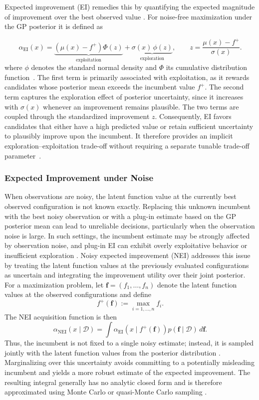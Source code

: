 Expected improvement (EI) remedies this by quantifying the expected magnitude of improvement over the best observed value \cite{jones1998efficient}. For noise-free maximization under the GP posterior it is defined as

\[
\alpha_{\mathrm{EI}}(x)
=
\underbrace{
\left(\mu(x)-f^{+}\right)\Phi(z)
}_{\text{exploitation}}
+
\underbrace{
\sigma(x)\,\phi(z)
}_{\text{exploration}},
\qquad
z=
\frac{\mu(x)-f^{+}}{\sigma(x)}.
\]
where $\phi$ denotes the standard normal density and $\Phi$ its cumulative distribution function~\cite{jones1998efficient}. The first term is primarily associated with exploitation, as it rewards candidates whose posterior mean exceeds the incumbent value $f^{+}$. The second term captures the exploration effect of posterior uncertainty, since it increases with $\sigma(x)$ whenever an improvement remains plausible. The two terms are coupled through the standardized improvement $z$. Consequently, EI favors candidates that either have a high predicted value or retain sufficient uncertainty to plausibly improve upon the incumbent. It therefore provides an implicit exploration--exploitation trade-off without requiring a separate tunable trade-off parameter~\cite{jones1998efficient}.

\subsubsection{Expected Improvement under Noise}
When observations are noisy, the latent function value at the currently best observed configuration is not known exactly. Replacing this unknown incumbent with the best noisy observation or with a plug-in estimate based on the GP posterior mean can lead to unreliable decisions, particularly when the observation noise is large. In such settings, the incumbent estimate may be strongly affected by observation noise, and plug-in EI can exhibit overly exploitative behavior or insufficient exploration \cite{letham2019constrained}. Noisy expected improvement (NEI) addresses this issue by treating the latent function values at the previously evaluated configurations as uncertain and integrating the improvement utility over their joint posterior. For a maximization problem, let $\mathbf{f}=(f_1,\ldots,f_n)$ denote the latent function values at the observed configurations and define
\[
f^{+}(\mathbf{f}) := \max_{i=1,\ldots,n} f_i.
\]
The NEI acquisition function is then
\[
\alpha_{\mathrm{NEI}}(x\mid\mathcal{D})
=
\int
\alpha_{\mathrm{EI}}\!\left(
x\mid f^{+}(\mathbf{f})
\right)
p(\mathbf{f}\mid\mathcal{D})\,d\mathbf{f}.
\]
Thus, the incumbent is not fixed to a single noisy estimate; instead, it is
sampled jointly with the latent function values from the posterior
distribution \cite{letham2019constrained}. Marginalizing over this uncertainty
avoids committing to a potentially misleading incumbent and yields a more
robust estimate of the expected improvement. The resulting integral generally
has no analytic closed form and is therefore approximated using Monte Carlo or
quasi-Monte Carlo sampling \cite{letham2019constrained,balandat2019botorch}.

